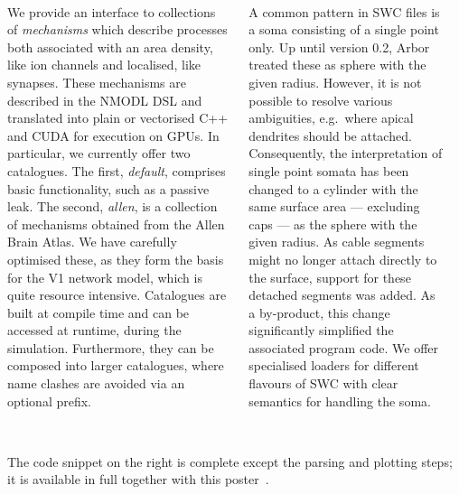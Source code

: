 \documentclass{beamer}
\begin{document}
\begin{frame}[t, fragile]
  \begin{columns}[onlytextwidth,T]
    \begin{column}{.49\linewidth}
      \textbf{}\\
      We provide an interface to collections of \emph{mechanisms} which describe
      processes both associated with an area density, like ion channels and
      localised, like synapses. These mechanisms are described in the NMODL DSL
      and translated into plain or vectorised C++ and CUDA for execution on GPUs.
      In particular, we currently offer two catalogues. The first, \emph{default},
      comprises basic functionality, such as a passive leak.
      The second, \emph{allen}, is a collection of mechanisms
      obtained from the Allen Brain Atlas\cite{mouse-atlas}. We have carefully
      optimised these, as they form the basis for the V1 network model, which is
      quite resource intensive. Catalogues are built at compile time and can be
      accessed at runtime, during the simulation. Furthermore, they can be composed
      into larger catalogues, where name clashes are avoided via an optional prefix.
    \end{column}
    \begin{column}{.49\linewidth}
      \textbf{}\\
      A common pattern in SWC files is a soma consisting of a single point only.
      Up until version 0.2, Arbor treated these as sphere with the given radius.
      However, it is not possible to
      resolve various ambiguities, e.g.\ where apical dendrites should be
      attached. Consequently, the interpretation of single point somata has been
      changed to a cylinder with the same surface area --- excluding caps --- as
      the sphere with the given radius. As cable segments might no longer attach
      directly to the surface, support for these detached segments was added. As
      a by-product, this change significantly simplified the associated program
      code. We offer specialised loaders for different flavours of SWC with
      clear semantics for handling the soma.
    \end{column}\\[2.5ex]
  \end{columns}
  \textbf{{\large{}}}\\
  The code snippet on the right is complete except the parsing and plotting
  steps; it is available in full together with this poster~\cite{my-source}.

\end{frame}
\end{document}
